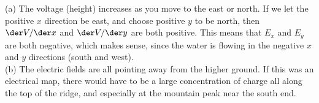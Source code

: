 (a) The voltage (height) increases as you move to the east or north.
If we let the positive $x$ direction be east, and choose positive $y$ to
be north, then $\der V/\der x$ and $\der V/\der y$ are both positive. This means that $E_x$
and $E_y$ are both negative, which makes sense, since the water is
flowing in the negative $x$ and $y$ directions (south and west).\\
(b) The
electric fields are all pointing away from the higher ground. If this
was an electrical map, there would have to be a large concentration of
charge all along the top of the ridge, and especially at the mountain
peak near the south end.



